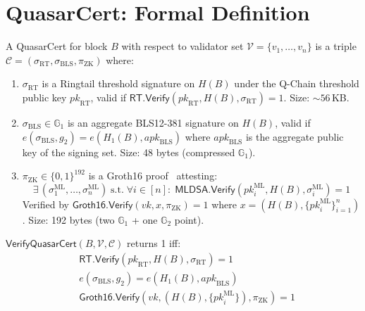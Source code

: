 \section{QuasarCert: Formal Definition}

\label{sec:quasarcert}

\begin{definition}[QuasarCert]
\label{def:quasarcert}
A QuasarCert for block $B$ with respect to validator set
$\mathcal{V} = \{v_1, \ldots, v_n\}$ is a triple
$\mathcal{C} = (\sigma_{\mathrm{RT}}, \sigma_{\mathrm{BLS}},
\pi_{\mathrm{ZK}})$ where:
\begin{enumerate}[nosep]
  \item $\sigma_{\mathrm{RT}}$ is a Ringtail threshold signature on
    $H(B)$ under the Q-Chain threshold public key
    $\mathit{pk}_{\mathrm{RT}}$, valid if
    $\mathsf{RT.Verify}(\mathit{pk}_{\mathrm{RT}}, H(B),
    \sigma_{\mathrm{RT}}) = 1$.
    Size: ${\sim}56$\,KB.
  \item $\sigma_{\mathrm{BLS}} \in \mathbb{G}_1$ is an aggregate
    BLS12-381 signature on $H(B)$, valid if
    $e(\sigma_{\mathrm{BLS}}, g_2) = e(H_1(B),
    \mathit{apk}_{\mathrm{BLS}})$ where $\mathit{apk}_{\mathrm{BLS}}$
    is the aggregate public key of the signing set.
    Size: 48 bytes (compressed $\mathbb{G}_1$).
  \item $\pi_{\mathrm{ZK}} \in \{0,1\}^{192}$ is a Groth16
    proof~\cite{groth2016} attesting:
    \[
      \exists\, (\sigma_1^{\mathrm{ML}}, \ldots,
      \sigma_n^{\mathrm{ML}}) \;\text{s.t.}\;
      \forall i \in [n]:\;
      \mathsf{MLDSA.Verify}(\mathit{pk}_i^{\mathrm{ML}}, H(B),
      \sigma_i^{\mathrm{ML}}) = 1
    \]
    Verified by
    $\mathsf{Groth16.Verify}(\mathit{vk}, x, \pi_{\mathrm{ZK}}) = 1$
    where $x = (H(B), \{\mathit{pk}_i^{\mathrm{ML}}\}_{i=1}^n)$.
    Size: 192 bytes (two $\mathbb{G}_1$ + one $\mathbb{G}_2$ point).
\end{enumerate}
\end{definition}

\begin{definition}
\label{def:verify-qcert}
$\mathsf{VerifyQuasarCert}(B, \mathcal{V}, \mathcal{C})$ returns 1 iff:
\begin{align}
  &\mathsf{RT.Verify}(\mathit{pk}_{\mathrm{RT}}, H(B),
    \sigma_{\mathrm{RT}}) = 1 \label{eq:v-rt} \\
  &e(\sigma_{\mathrm{BLS}}, g_2) =
    e(H_1(B), \mathit{apk}_{\mathrm{BLS}}) \label{eq:v-bls} \\
  &\mathsf{Groth16.Verify}(\mathit{vk}, (H(B),
    \{\mathit{pk}_i^{\mathrm{ML}}\}), \pi_{\mathrm{ZK}}) = 1
    \label{eq:v-zk}
\end{align}
\end{definition}

